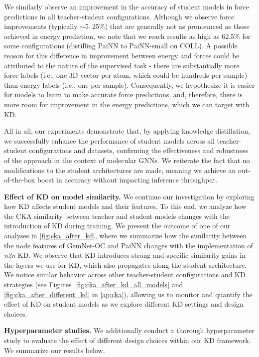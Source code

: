 \documentclass{article}
\begin{document}
We similarly observe an improvement in the accuracy of student models in force predictions in all teacher-student configurations. Although we observe force improvements (typically $\sim$\numrange[range-phrase = --]{5}{25}$\%$) that are generally not as pronounced as those achieved in energy prediction, we note that we reach results as high as $62.5\%$ for some configurations (distilling PaiNN to PaiNN-small on COLL). A possible reason for this difference in improvement between energy and forces could be attributed to the nature of the supervised task - there are substantially more force labels (i.e., one 3D vector per atom, which could be hundreds per sample) than energy labels (i.e., one per sample). Consequently, we hypothesize it is easier for models to learn to make accurate force predictions, and, therefore, there is more room for improvement in the energy predictions, which we can target with KD. 

All in all, our experiments demonstrate that, by applying knowledge distillation, we successfully enhance the performance of student models across all teacher-student configurations and datasets, confirming the effectiveness and robustness of the approach in the context of molecular GNNs.
% 
We reiterate the fact that no modifications to the student architectures are made, meaning we achieve an out-of-the-box boost in accuracy without impacting inference throughput.

\textbf{Effect of KD on model similarity.}
We continue our investigation by exploring how KD affects student models and their features. To this end, we analyze how the CKA similarity between teacher and student models changes with the introduction of KD during training. We present the outcome of one of our analyses in \cref{fig:cka_after_kd}, where we summarize how the similarity between the node features of GemNet-OC and PaiNN changes with the implementation of \emph{n2n} KD. We observe that KD introduces strong and specific similarity gains in the layers we use for KD, which also propagates along the student architecture. We notice similar behavior across other teacher-student configurations and KD strategies (see Figures~\ref{fig:cka_after_kd_all_models} and \ref{fig:cka_after_different_kd} in \cref{ap:cka}), allowing us to monitor and quantify the effect of KD on student models as we explore different KD settings and design choices.

\textbf{Hyperparameter studies.} 
We additionally conduct a thorough hyperparameter study to evaluate the effect of different design choices within our KD framework. We summarize our results below. 
\end{document}

